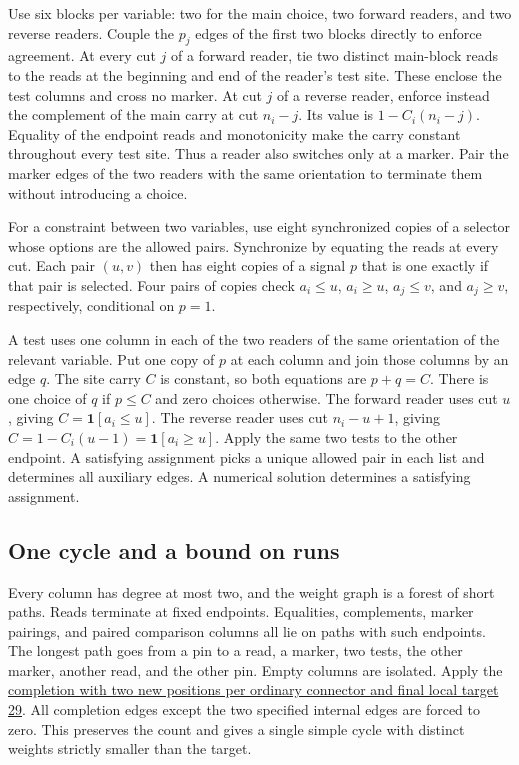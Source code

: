 \documentclass[11pt,a4paper]{article}
\numberwithin{equation}{section}
\begin{document}
Use six blocks per variable: two for the main choice, two forward readers, and two reverse readers. Couple the \(p_j\) edges of the first two blocks directly to enforce agreement. At every cut \(j\) of a forward reader, tie two distinct main-block reads to the reads at the beginning and end of the reader's test site. These enclose the test columns and cross no marker. At cut \(j\) of a reverse reader, enforce instead the complement of the main carry at cut \(n_i-j\). Its value is \(1-C_i(n_i-j)\). Equality of the endpoint reads and monotonicity make the carry constant throughout every test site. Thus a reader also switches only at a marker. Pair the marker edges of the two readers with the same orientation to terminate them without introducing a choice.

For a constraint between two variables, use eight synchronized copies of a selector whose options are the allowed pairs. Synchronize by equating the reads at every cut. Each pair \((u,v)\) then has eight copies of a signal \(p\) that is one exactly if that pair is selected. Four pairs of copies check \(a_i\le u\), \(a_i\ge u\), \(a_j\le v\), and \(a_j\ge v\), respectively, conditional on \(p=1\).

A test uses one column in each of the two readers of the same orientation of the relevant variable. Put one copy of \(p\) at each column and join those columns by an edge \(q\). The site carry \(C\) is constant, so both equations are \(p+q=C\). There is one choice of \(q\) if \(p\le C\) and zero choices otherwise. The forward reader uses cut \(u\), giving \(C=\mathbf1[a_i\le u]\). The reverse reader uses cut \(n_i-u+1\), giving \(C=1-C_i(u-1)=\mathbf1[a_i\ge u]\). Apply the same two tests to the other endpoint. A satisfying assignment picks a unique allowed pair in each list and determines all auxiliary edges. A numerical solution determines a satisfying assignment.

\subsection{One cycle and a bound on runs}\label{one-cycle-and-a-bound-on-runs}

Every column has degree at most two, and the weight graph is a forest of short paths. Reads terminate at fixed endpoints. Equalities, complements, marker pairings, and paired comparison columns all lie on paths with such endpoints. The longest path goes from a pin to a read, a marker, two tests, the other marker, another read, and the other pin. Empty columns are isolated. Apply the \href{https://github.com/Leonardo-Italia/p-vs-np-open-notebook/blob/b07860a0b854bd3f898114aa6a2476fcbab1cf56/research/04-fixed-weights-and-proofs.md\#black-box-verifier}{completion with two new positions per ordinary connector and final local target 29}. All completion edges except the two specified internal edges are forced to zero. This preserves the count and gives a single simple cycle with distinct weights strictly smaller than the target.
\end{document}
